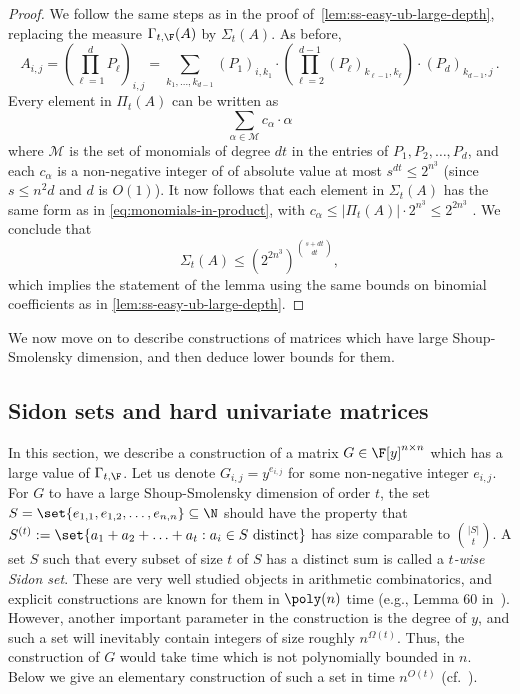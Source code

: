 \begin{proof}
We follow the same steps as in the proof of~\autoref{lem:ss-easy-ub-large-depth}, replacing the measure $\Gamma_{t,\F}(A)$ by $\Sigma_t(A)$. As before, 
\[
A_{i,j} = \left(\prod_{\ell = 1}^d P_{\ell}\right)_{i,j} = \sum_{k_1, \ldots, k_{d-1}} (P_1)_{i, k_1}\cdot \left(\prod_{\ell = 2}^{d-1} (P_{\ell})_{k_{\ell-1}, k_{\ell}} \right) \cdot (P_{d})_{k_{d-1}, j}\, .
\]
Every element in $\Pi_{t} (A)$ can be written as 
\begin{equation}
\label{eq:monomials-in-product}
\sum_{\alpha \in \mathcal{M}} c_\alpha \cdot \alpha
\end{equation}
where $\mathcal{M}$ is the set of monomials of degree $dt$ in the entries of $P_1, P_2, \ldots, P_d$, and each $c_\alpha$ is a non-negative integer of of absolute value at most $s^{dt} \le 2^{n^3}$ (since $s \leq n^2d$ and $d$ is $O(1)$). It now follows that each element in $\Sigma_t(A)$ has the same form as in \eqref{eq:monomials-in-product}, with $c_\alpha \le |\Pi_t(A)| \cdot 2^{n^3} \le 2^{2n^3}$ . We conclude that
\[
\Sigma_t(A) \le (2^{2n^3})^{\binom{s+dt}{dt}},
\]
which implies the statement of the lemma using the same bounds on binomial coefficients as in \autoref{lem:ss-easy-ub-large-depth}.
\end{proof}


We now move on to describe constructions of matrices which have large Shoup-Smolensky dimension, and then deduce lower bounds for them.

\subsection{Sidon sets and hard univariate matrices}\label{sec:sidon-ss dim}
In this section, we describe a construction of a matrix $G \in \F[y]^{n \times n}$ which has a large value of $\Gamma_{t, \F}$. Let us denote $G_{i,j} = y^{e_{i,j}}$ for some non-negative integer $e_{i,j}$. For $G$ to have a large Shoup-Smolensky dimension of order $t$, the set $S = \set{e_{1,1}, e_{1,2}, \ldots, e_{n,n}} \subseteq \N$ should have the property that $S^{(t)} := \set{a_1 + a_2 + \ldots + a_t : a_i \in S \text{ distinct}}$ has size comparable to $\binom{|S|}{t}$. A set $S$ such that every subset of size $t$ of $S$ has a distinct sum is called a \emph{$t$-wise Sidon set}. These are very well studied objects in arithmetic combinatorics, and explicit constructions are known for them in $\poly(n)$ time (e.g., Lemma 60 in~\cite{Bshouty}). However, another important parameter in the construction is the degree of $y$, and such a set will inevitably contain integers of size roughly $n^{\Omega(t)}$. Thus, the construction of $G$ would take time which is not polynomially bounded in $n$. Below we give an elementary construction of such a set in time $n^{O(t)}$ (cf.\ \cite{AGKS15}).

